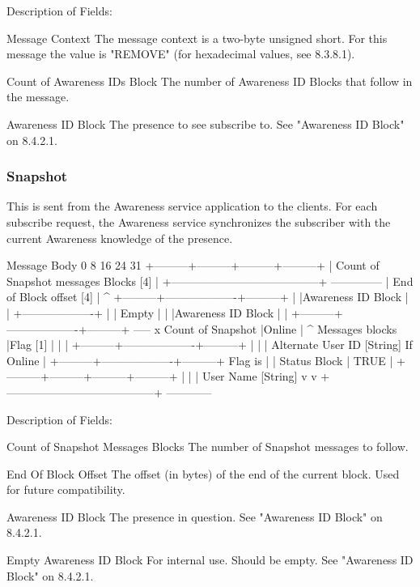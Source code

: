 \documentclass[titlepage,oneside]{book}
\begin{document}
Description of Fields:

Message Context
  The message context is a two-byte unsigned short. For this message 
  the value is "REMOVE" (for hexadecimal values, see 
  8.3.8.1).

Count of Awareness IDs Block
  The number of Awareness ID Blocks that follow in the message.

Awareness ID Block
  The presence to see subscribe to. See "Awareness ID Block" on
  8.4.2.1.

\subsubsection{Snapshot}

This is sent from the Awareness service application to the clients.
For each subscribe request, the Awareness service synchronizes the
subscriber with the current Awareness knowledge of the presence.

Message Body
0         8         16        24      31
+---------+---------+---------+---------+
| Count of Snapshot messages Blocks [4] |
+---------------------------------------+ --------------
|      End of Block offset [4]          |            ^
+---------+-------------------+---------+            |
          |Awareness ID Block |                      |
          +-------------------+                      |
          |       Empty       |                      |
          |Awareness ID Block |                      |
+---------+-------------------+---------+ -----  x Count of Snapshot
|Online   |                                  ^      Messages blocks
|Flag [1] |                                  |       |
+---------+-------------------+---------+    |       |
| Alternate User ID [String]               If Online |
+---------+-------------------+---------+  Flag is   |
          |   Status Block    |              TRUE    |
+---------+---------+---------+---------+    |       |
| User Name [String]                         v       v
+---------------------------------------+ ------------

Description of Fields:

Count of Snapshot Messages Blocks
  The number of Snapshot messages to follow.

End Of Block Offset
  The offset (in bytes) of the end of the current block. Used for
  future compatibility.

Awareness ID Block
  The presence in question. See "Awareness ID Block" on
8.4.2.1.

Empty Awareness ID Block
  For internal use. Should be empty. See "Awareness ID Block" on
  8.4.2.1.
\end{document}
